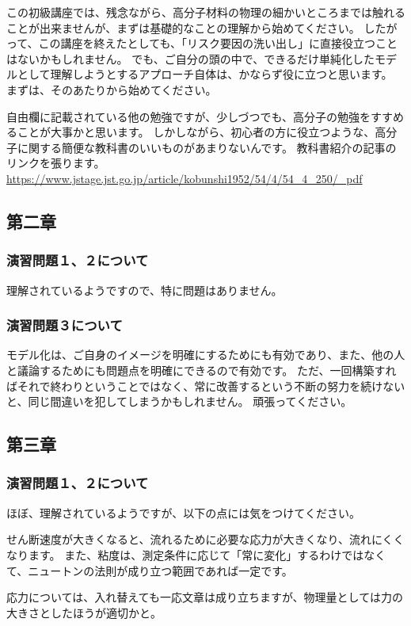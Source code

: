 \documentclass[uplatex,dvipdfmx,a4paper,11pt]{jsreport}
\begin{document}
この初級講座では、残念ながら、高分子材料の物理の細かいところまでは触れることが出来ませんが、まずは基礎的なことの理解から始めてください。
したがって、この講座を終えたとしても、「リスク要因の洗い出し」に直接役立つことはないかもしれません。
でも、ご自分の頭の中で、できるだけ単純化したモデルとして理解しようとするアプローチ自体は、かならず役に立つと思います。
まずは、そのあたりから始めてください。

自由欄に記載されている他の勉強ですが、少しづつでも、高分子の勉強をすすめることが大事かと思います。
しかしながら、初心者の方に役立つような、高分子に関する簡便な教科書のいいものがあまりないんです。
教科書紹介の記事のリンクを張ります。\\
\url{https://www.jstage.jst.go.jp/article/kobunshi1952/54/4/54_4_250/_pdf}

\subsection*{第二章}
\subsubsection*{演習問題１、２について}
理解されているようですので、特に問題はありません。

\subsubsection*{演習問題３について}

モデル化は、ご自身のイメージを明確にするためにも有効であり、また、他の人と議論するためにも問題点を明確にできるので有効です。
ただ、一回構築すればそれで終わりということではなく、常に改善するという不断の努力を続けないと、同じ間違いを犯してしまうかもしれません。
頑張ってください。

\subsection*{第三章}
\subsubsection*{演習問題１、２について}
ほぼ、理解されているようですが、以下の点には気をつけてください。

せん断速度が大きくなると、流れるために必要な応力が大きくなり、流れにくくなります。
また、粘度は、測定条件に応じて「常に変化」するわけではなくて、ニュートンの法則が成り立つ範囲であれば一定です。

応力については、入れ替えても一応文章は成り立ちますが、物理量としては力の大きさとしたほうが適切かと。
\end{document}
